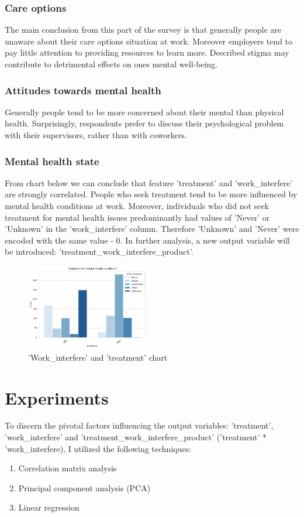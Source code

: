 \documentclass[conference]{IEEEtran}
\begin{document}
\subsubsection{\textbf{Care options}}
The main conclusion from this part of the survey is that generally people are unaware about their care options situation at work. Moreover employers tend to pay little attention to providing resources to learn more. Described stigma may contribute to detrimental effects on ones mental well-being.\\

\subsubsection{\textbf{Attitudes towards mental health}}
Generally people tend to be more concerned about their mental than physical health. Surprisingly, respondents prefer to discuss their psychological problem with their supervisors, rather than with coworkers.\\  

\subsubsection{\textbf{Mental health state}}
From chart below we can conclude that feature 'treatment' and 'work\_interfere' are strongly correlated. People who seek treatment tend to be more influenced by mental health conditions at work. Moreover, individuals who did not seek treatment for mental health issues predominantly had values of 'Never' or 'Unknown' in the 'work\_interfere' column. Therefore 'Unknown' and 'Never' were encoded with the same value - 0. In further analysis, a new output variable will be introduced: 'treatment\_work\_interfere\_product'.
\begin{figure}[h]
    \includegraphics[width=0.48\textwidth]{images/treatment-work-interfere.png}
    \caption{'Work\_interfere' and 'treatment' chart}
\end{figure} 

\section{Experiments}
To discern the pivotal factors influencing the output variables: 'treatment', 'work\_interfere' and 'treatment\_work\_interfere\_product' ('treatment' * 'work\_interfere), I utilized the following techniques:
\begin{enumerate}
    \item Correlation matrix analysis
    \item Principal component analysis (PCA)
    \item Linear regression
\end{enumerate}
\end{document}
